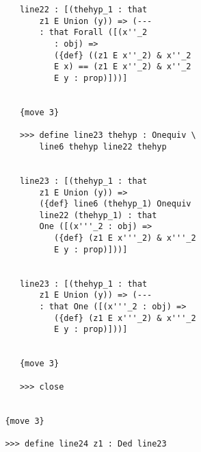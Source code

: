 \documentclass[12pt]{article}
\begin{document}
\begin{verbatim}
            line22 : [(thehyp_1 : that 
                z1 E Union (y)) => (--- 
                : that Forall ([(x''_2 
                   : obj) => 
                   ({def} ((z1 E x''_2) & x''_2 
                   E x) == (z1 E x''_2) & x''_2 
                   E y : prop)]))]


            {move 3}

            >>> define line23 thehyp : Onequiv \
                line6 thehyp line22 thehyp


            line23 : [(thehyp_1 : that 
                z1 E Union (y)) => 
                ({def} line6 (thehyp_1) Onequiv 
                line22 (thehyp_1) : that 
                One ([(x'''_2 : obj) => 
                   ({def} (z1 E x'''_2) & x'''_2 
                   E y : prop)]))]


            line23 : [(thehyp_1 : that 
                z1 E Union (y)) => (--- 
                : that One ([(x'''_2 : obj) => 
                   ({def} (z1 E x'''_2) & x'''_2 
                   E y : prop)]))]


            {move 3}

            >>> close


         {move 3}

         >>> define line24 z1 : Ded line23



\end{verbatim}
\end{document}
